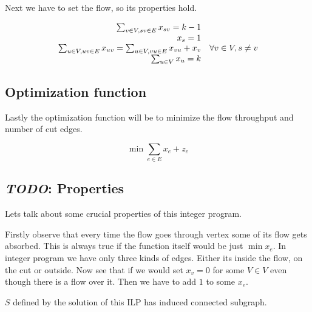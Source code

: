 \documentclass{article}
\begin{document}
	Next we have to set the flow, so its properties hold.
	
	$$
	\begin{array}{r l}
		\sum_{v \in V, sv \in E} x_{sv} = k-1 \\
		x_s = 1 \\
		\sum_{u \in V, uv \in E} x_{uv} = \sum_{u \in V, vu \in E} x_{vu} + x_v & \forall v \in V, s \neq v \\
		\sum_{u \in V} x_u = k
	\end{array}
	$$
	
	\subsection{Optimization function}
	
	Lastly the optimization function will be to minimize the flow throughput and number of cut edges.
	
	$$
	\min \sum_{e \in E} x_e + z_e
	$$
	
	\subsection{\textit{TODO}: Properties}
	
	Lets talk about some crucial properties of this integer program.
		
	Firstly observe that every time the flow goes through vertex some of its flow gets absorbed. This is always true if the function itself would be just $\min x_e$. In integer program we have only three kinds of edges. Either its inside the flow, on the cut or outside. Now see that if we would set $x_v = 0$ for some $V \in V$ even though there is a flow over it. Then we have to add $1$ to some $x_e$.
	
	$S$ defined by the solution of this ILP has induced connected subgraph.
\end{document}
